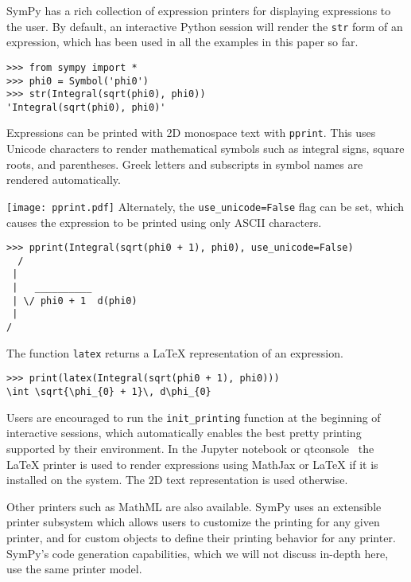 
SymPy has a rich collection of expression printers for displaying expressions
to the user. By default, an interactive Python session will render the
\verb|str| form of an expression, which has been used in all the examples in
this paper so far.

\begin{verbatim}
>>> from sympy import *
>>> phi0 = Symbol('phi0')
>>> str(Integral(sqrt(phi0), phi0))
'Integral(sqrt(phi0), phi0)'
\end{verbatim}

Expressions can be printed with 2D monospace text with \verb|pprint|. This
uses Unicode characters to render mathematical symbols such as integral signs,
square roots, and parentheses. Greek letters and subscripts in symbol names
are rendered automatically.

\noindent
\texttt{[image: pprint.pdf]}
Alternately, the \verb|use_unicode=False| flag can be set, which causes the
expression to be printed using only ASCII characters.

\begin{verbatim}
>>> pprint(Integral(sqrt(phi0 + 1), phi0), use_unicode=False)
  /
 |
 |   __________
 | \/ phi0 + 1  d(phi0)
 |
/
\end{verbatim}

The function \verb|latex| returns a \LaTeX{} representation of an expression.

\begin{verbatim}
>>> print(latex(Integral(sqrt(phi0 + 1), phi0)))
\int \sqrt{\phi_{0} + 1}\, d\phi_{0}
\end{verbatim}

Users are encouraged to run the \verb|init_printing| function at the beginning
of interactive sessions, which automatically enables the best pretty printing
supported by their environment. In the Jupyter notebook or
qtconsole~\cite{perez2007ipython} the \LaTeX{} printer is used to render
expressions using MathJax or \LaTeX{} if it is installed on the system. The 2D
text representation is used otherwise.

Other printers such as MathML are also available. SymPy uses an extensible
printer subsystem which allows users to customize the printing for any given
printer, and for custom objects to define their printing behavior for any
printer. SymPy's code generation capabilities, which we will not discuss
in-depth here, use the same printer model.
